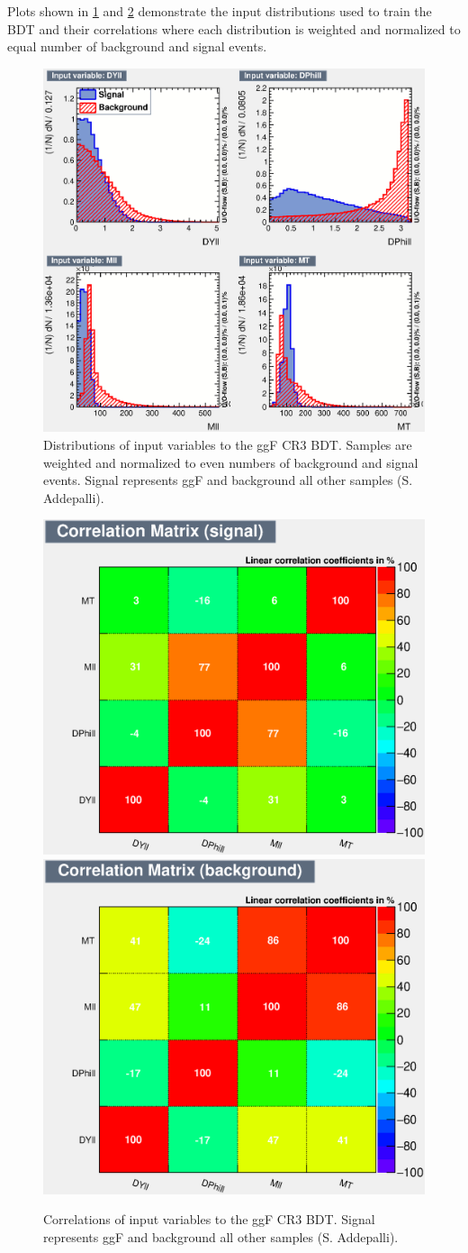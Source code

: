 Plots shown in \ref{fig:ggFCR3BDTinput} and \ref{fig:ggFCR3corrSB} demonstrate the input distributions used to train the BDT and their correlations where each distribution is weighted and normalized to equal number of background and signal events. 

\begin{figure}[!htbp]
    \centering
    \includegraphics[width=0.45\linewidth]{Pictures/ggFCR3/variables_id_c1.eps}
    \caption{Distributions of input variables to the ggF CR3 BDT. Samples are weighted and normalized to even numbers of background and signal events. Signal represents ggF and background all other samples (S. Addepalli).}
    \label{fig:ggFCR3BDTinput}
\end{figure}
\begin{figure}[!htbp]
\centering
  \includegraphics[width=.3\linewidth]{Pictures/ggFCR3/CorrelationMatrixS.eps}
  \includegraphics[width=.3\linewidth]{Pictures/ggFCR3/CorrelationMatrixB.eps}
\caption{Correlations of input variables to the ggF CR3 BDT. Signal represents ggF and background all other samples (S. Addepalli).}
\label{fig:ggFCR3corrSB}
\end{figure}

